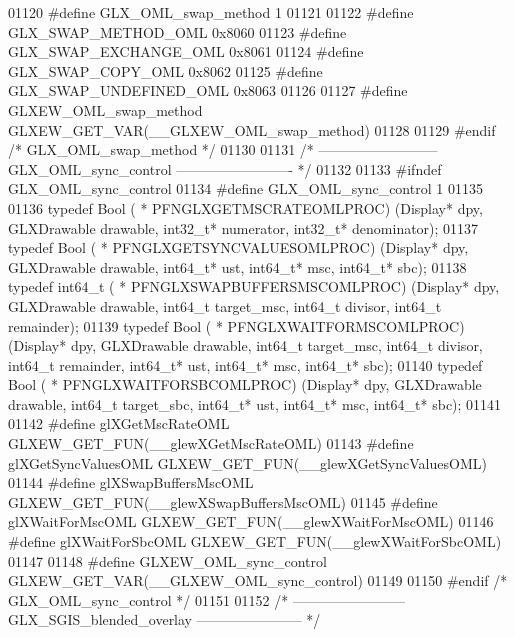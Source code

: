 \begin{DoxyCode}
01120 \textcolor{preprocessor}{#define GLX\_OML\_swap\_method 1}
01121 
01122 \textcolor{preprocessor}{#define GLX\_SWAP\_METHOD\_OML 0x8060}
01123 \textcolor{preprocessor}{#define GLX\_SWAP\_EXCHANGE\_OML 0x8061}
01124 \textcolor{preprocessor}{#define GLX\_SWAP\_COPY\_OML 0x8062}
01125 \textcolor{preprocessor}{#define GLX\_SWAP\_UNDEFINED\_OML 0x8063}
01126 
01127 \textcolor{preprocessor}{#define GLXEW\_OML\_swap\_method GLXEW\_GET\_VAR(\_\_GLXEW\_OML\_swap\_method)}
01128 
01129 \textcolor{preprocessor}{#endif }\textcolor{comment}{/* GLX\_OML\_swap\_method */}\textcolor{preprocessor}{}
01130 
01131 \textcolor{comment}{/* -------------------------- GLX\_OML\_sync\_control ------------------------- */}
01132 
01133 \textcolor{preprocessor}{#ifndef GLX\_OML\_sync\_control}
01134 \textcolor{preprocessor}{#define GLX\_OML\_sync\_control 1}
01135 
01136 \textcolor{keyword}{typedef} Bool ( * PFNGLXGETMSCRATEOMLPROC) (Display* dpy, GLXDrawable drawable, int32\_t* 
      numerator, int32\_t* denominator);
01137 \textcolor{keyword}{typedef} Bool ( * PFNGLXGETSYNCVALUESOMLPROC) (Display* dpy, GLXDrawable drawable, int64\_t* 
      ust, int64\_t* msc, int64\_t* sbc);
01138 \textcolor{keyword}{typedef} int64\_t ( * PFNGLXSWAPBUFFERSMSCOMLPROC) (Display* dpy, GLXDrawable drawable, int64\_t 
      target_msc, int64\_t divisor, int64\_t remainder);
01139 \textcolor{keyword}{typedef} Bool ( * PFNGLXWAITFORMSCOMLPROC) (Display* dpy, GLXDrawable drawable, int64\_t 
      target_msc, int64\_t divisor, int64\_t remainder, int64\_t* ust, int64\_t* msc, int64\_t* 
      sbc);
01140 \textcolor{keyword}{typedef} Bool ( * PFNGLXWAITFORSBCOMLPROC) (Display* dpy, GLXDrawable drawable, int64\_t 
      target_sbc, int64\_t* ust, int64\_t* msc, int64\_t* sbc);
01141 
01142 \textcolor{preprocessor}{#define glXGetMscRateOML GLXEW\_GET\_FUN(\_\_glewXGetMscRateOML)}
01143 \textcolor{preprocessor}{#define glXGetSyncValuesOML GLXEW\_GET\_FUN(\_\_glewXGetSyncValuesOML)}
01144 \textcolor{preprocessor}{#define glXSwapBuffersMscOML GLXEW\_GET\_FUN(\_\_glewXSwapBuffersMscOML)}
01145 \textcolor{preprocessor}{#define glXWaitForMscOML GLXEW\_GET\_FUN(\_\_glewXWaitForMscOML)}
01146 \textcolor{preprocessor}{#define glXWaitForSbcOML GLXEW\_GET\_FUN(\_\_glewXWaitForSbcOML)}
01147 
01148 \textcolor{preprocessor}{#define GLXEW\_OML\_sync\_control GLXEW\_GET\_VAR(\_\_GLXEW\_OML\_sync\_control)}
01149 
01150 \textcolor{preprocessor}{#endif }\textcolor{comment}{/* GLX\_OML\_sync\_control */}\textcolor{preprocessor}{}
01151 
01152 \textcolor{comment}{/* ------------------------ GLX\_SGIS\_blended\_overlay ----------------------- */}

\end{DoxyCode}
